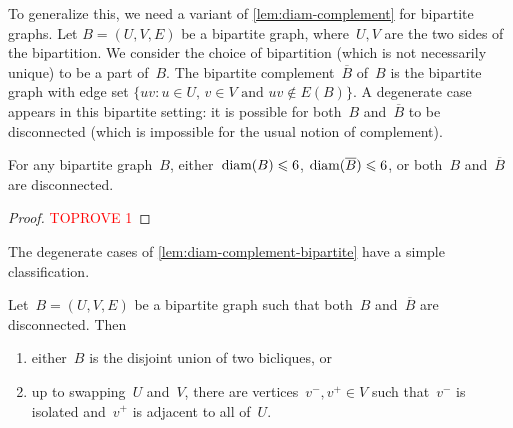 \documentclass[a4paper,UKenglish,cleveref, autoref, thm-restate]{lipics-v2021}
\newcommand{\diam}{\textnormal{diam}}
\renewcommand{\le}{\leqslant}
\begin{document}
To generalize this, we need a variant of \cref{lem:diam-complement} for bipartite graphs.
Let $B = (U,V,E)$ be a bipartite graph, where~$U,V$ are the two sides of the bipartition.
We consider the choice of bipartition (which is not necessarily unique) to be a part of~$B$.
The bipartite complement~$\overline{B}$ of~$B$ is the bipartite graph with edge set $\{uv : \text{$u \in U$, $v \in V$ and $uv \not\in E(B)$} \}$.
A degenerate case appears in this bipartite setting:
it is possible for both~$B$ and~$\overline{B}$ to be disconnected (which is impossible for the usual notion of complement).
\begin{lemma}
  \label{lem:diam-complement-bipartite}
  For any bipartite graph~$B$,
  either~$\diam(B) \le \diamBoundBip$, $\diam(\overline{B}) \le \diamBoundBip$, or both~$B$ and~$\overline{B}$ are disconnected.
\end{lemma}

\begin{proof}\textcolor{red}{TOPROVE 1}\end{proof}

The degenerate cases of \cref{lem:diam-complement-bipartite} have a simple classification.
\begin{lemma}
  \label{lem:bipartite-disco-classification}
  Let~$B = (U,V,E)$ be a bipartite graph such that both~$B$ and~$\overline{B}$ are disconnected. Then
  \begin{enumerate}
    \item \label{it1:bdc} either~$B$ is the disjoint union of two bicliques, or
    \item \label{it2:bdc} up to swapping~$U$ and~$V$, there are vertices~$v^-,v^+ \in V$
      such that~$v^-$ is isolated and~$v^+$ is adjacent to all of~$U$.
  \end{enumerate}
\end{lemma}
\end{document}
